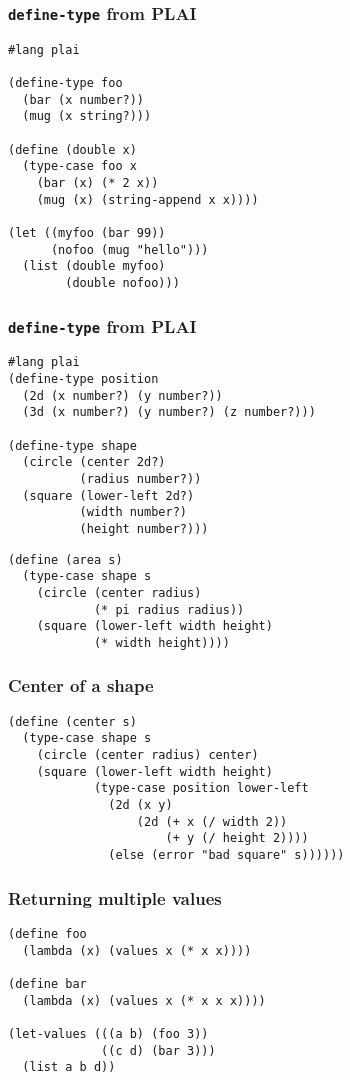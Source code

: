 \documentclass{beamer}
\newcommand{\bfr}[1]{\begin{frame}[fragile]\frametitle{{ #1 }}}
\begin{document}
\bfr{{\tt define-type} from PLAI}
\begin{lstlisting}
#lang plai

(define-type foo
  (bar (x number?))
  (mug (x string?)))

(define (double x)
  (type-case foo x
    (bar (x) (* 2 x))
    (mug (x) (string-append x x))))

(let ((myfoo (bar 99))
      (nofoo (mug "hello")))
  (list (double myfoo)
        (double nofoo)))
\end{lstlisting}
\end{frame}
\bfr{{\tt define-type} from PLAI}
\begin{lstlisting}
#lang plai
(define-type position
  (2d (x number?) (y number?))
  (3d (x number?) (y number?) (z number?)))

(define-type shape
  (circle (center 2d?) 
          (radius number?))
  (square (lower-left 2d?) 
          (width number?) 
          (height number?)))
\end{lstlisting}
\begin{lstlisting}
(define (area s)
  (type-case shape s
    (circle (center radius)
            (* pi radius radius))
    (square (lower-left width height)
            (* width height))))
\end{lstlisting}
\end{frame}

\bfr{Center of a shape}
\begin{lstlisting}
(define (center s)
  (type-case shape s
    (circle (center radius) center)
    (square (lower-left width height)
            (type-case position lower-left
              (2d (x y)
                  (2d (+ x (/ width 2)) 
                      (+ y (/ height 2))))
              (else (error "bad square" s))))))
\end{lstlisting}
\end{frame}
\bfr{Returning multiple values}
\begin{lstlisting}
(define foo
  (lambda (x) (values x (* x x))))

(define bar
  (lambda (x) (values x (* x x x))))

(let-values (((a b) (foo 3))
             ((c d) (bar 3)))
  (list a b d))
\end{lstlisting}
\end{frame}
\end{document}
